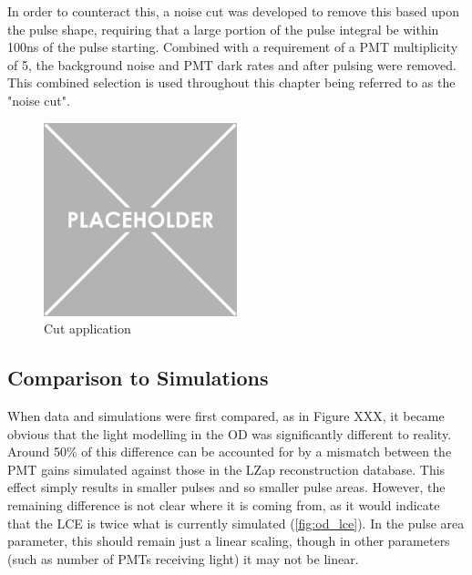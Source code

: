 \par
In order to counteract this, a noise cut was developed to remove this based upon the pulse shape, requiring that a large portion of the pulse integral be within 100ns of the pulse starting.
Combined with a requirement of a PMT multiplicity of 5, the background noise and PMT dark rates and after pulsing were removed.
This combined selection is used throughout this chapter being referred to as the "noise cut".

\begin{figure}
    \centering
    \includegraphics[width=0.5\textwidth]{Figures/Placeholder.png}
    \caption{Cut application}
    \label{fig:od_noise_cut}
\end{figure}

\subsection{Comparison to Simulations}
\par

When data and simulations were first compared, as in Figure XXX, it became obvious that the light modelling in the OD was significantly different to reality.
Around 50\% of this difference can be accounted for by a mismatch between the PMT gains simulated against those in the LZap reconstruction database.
This effect simply results in smaller pulses and so smaller pulse areas.
However, the remaining difference is not clear where it is coming from, as it would indicate that the LCE is twice what is currently simulated (\autoref{fig:od_lce}).
In the pulse area parameter, this should remain just a linear scaling, though in other parameters (such as number of PMTs receiving light) it may not be linear.




